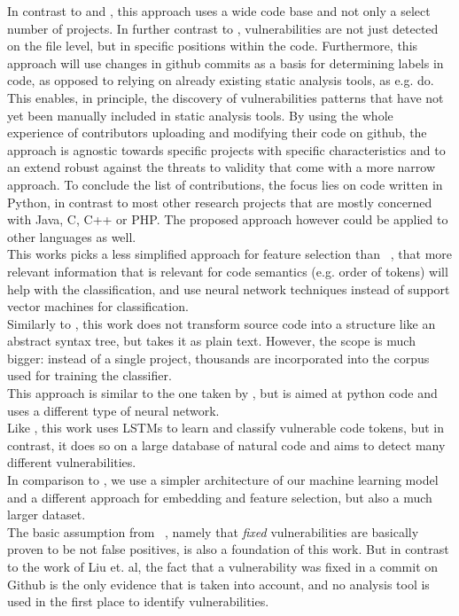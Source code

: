 \documentclass[
	a4paper,
	pagesize,
	pdftex,
	12pt,
	twoside, %
	BCOR=5mm, %
	ngerman,
	fleqn,
	final,
	]{scrartcl}
\begin{document}
In contrast to \cite{Li.2018} and \cite{Dam.2017}, this approach uses a wide code base and not only a select number of projects. In further contrast to \cite{Dam.2017}, vulnerabilities are not just detected on the file level, but in specific positions within the code. 
Furthermore, this approach will use changes in github commits as a basis for determining labels in code, as opposed to relying on already existing static analysis tools, as e.g.  \cite{Russell.2018} do. This enables, in principle, the discovery of vulnerabilities patterns that have not yet been manually included in static analysis tools. By using the whole experience of contributors uploading and modifying their code on github, the approach is agnostic towards specific projects with specific characteristics and to an extend robust against the threats to validity that come with a more narrow approach. To conclude the list of contributions, the focus lies on code written in Python, in contrast to most other research projects that are mostly concerned with Java, C, C++ or PHP. The proposed approach however could be applied to other languages as well. \\
This works picks a less simplified approach for feature selection than ~\cite{Pang.2015}, that more relevant information that is relevant for code semantics (e.g. order of tokens) will help with the classification, and use neural network techniques instead of support vector machines for classification. \\
Similarly to \cite{Hovsepyan.2012}, this work does not transform source code into a structure like an abstract syntax tree, but takes it as plain text. However, the scope is much bigger: instead of a single project, thousands are incorporated into the corpus used for training the classifier. \\
This approach is similar to the one taken by \cite{Russell.2018}, but is aimed at python code and uses a different type of neural network. \\
Like \cite{Li.2018}, this work uses LSTMs to learn and classify vulnerable code tokens, but in contrast, it does so on a large database of natural code and aims to detect many different vulnerabilities. \\
In comparison to \cite{Dam.2017}, we use a simpler architecture of our machine learning model and a different approach for embedding and feature selection, but also a much larger dataset. \\
The basic assumption from ~\cite{Liu.2018}, namely that \textit{fixed} vulnerabilities are basically proven to be not false positives, is also a foundation of this work. But in contrast to the work of Liu et. al, the fact that a vulnerability was fixed in a commit on Github is the only evidence that is taken into account, and no analysis tool is used in the first place to identify vulnerabilities.
\end{document}
